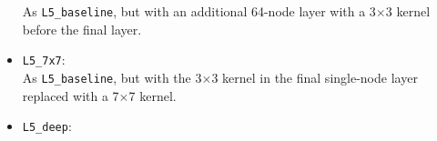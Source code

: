 \begin{itemize}
\hspace*{1em}As \texttt{L5\_baseline}, but with an additional 64-node layer with a 3$\times$3 kernel before the final layer.
\item \texttt{L5\_7x7}: \\
\hspace*{1em}As \texttt{L5\_baseline}, but with the 3$\times$3 kernel in the final single-node layer replaced with a 7$\times$7 kernel.
\item \texttt{L5\_deep}: \\
%

\end{itemize}
